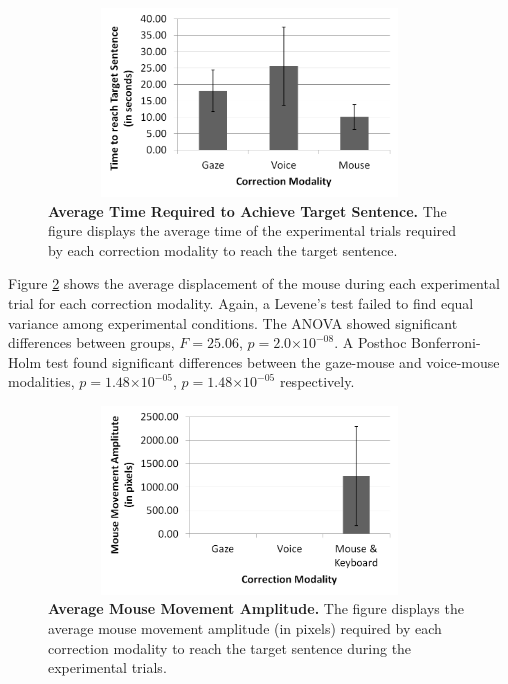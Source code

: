\documentclass[]{article}
\providecommand{\e}[1]{\ensuremath{\times 10^{#1}}}
\begin{document}
\begin{figure}[ht]
\begin{center}
\vspace{-3mm}
\includegraphics[width=0.95\textwidth,height=50mm]{figures/time.png}
\end{center}
\caption{\textbf{Average Time Required to Achieve Target Sentence.} The figure displays the average time of the
experimental trials required by each correction modality to reach the target sentence.}
\label{timeFig}
\end{figure}


Figure \ref{mouseDisplacement} shows the average displacement of the mouse during each experimental trial for each
correction modality. Again, a Levene's test failed to find equal variance among experimental conditions. The ANOVA
showed significant differences between groups,  $F=25.06$, $p=2.0\e{-08}$. A Posthoc Bonferroni-Holm test found
significant differences between the gaze-mouse and voice-mouse modalities,  $p=1.48\e{-05}$,
$p=1.48\e{-05}$ respectively.


\begin{figure}[ht]
\begin{center}
\vspace{-3mm}
\includegraphics[width=0.95\textwidth,height=50mm]{figures/mouseDisplacement.png}
\end{center}
\caption{\textbf{Average Mouse Movement Amplitude.} The figure displays the average mouse movement amplitude (in pixels)
required by each correction modality to reach the target sentence during the experimental trials.}
\label{mouseDisplacement}
\end{figure}
\end{document}
